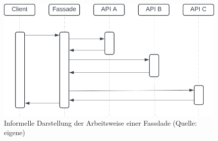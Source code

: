 \begin{figure}
    \centering
    \includegraphics[scale=0.4]{part two/Objektorientierter Entwurf/img/fassade}
    \caption{Informelle Darstellung der Arbeitsweise einer Fassdade (Quelle: eigene)}
    \label{fig:fassade_cc}
\end{figure}
